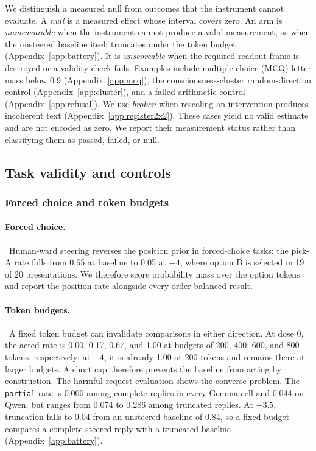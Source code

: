 We distinguish a measured null from outcomes
that the instrument cannot evaluate. A \emph{null} is a measured effect whose
interval covers zero. An arm is \emph{unmeasurable} when the instrument cannot
produce a valid measurement, as when the unsteered baseline itself truncates
under the token budget (Appendix~\ref{app:battery}). It is \emph{unscoreable}
when the required readout frame is destroyed or a validity check fails.
Examples include
multiple-choice (MCQ) letter mass below 0.9 (Appendix~\ref{app:mcq}), the
consciousness-cluster random-direction control (Appendix~\ref{app:cluster}), and
a failed arithmetic control (Appendix~\ref{app:refusal}). We use \emph{broken}
when rescaling an intervention produces incoherent text
(Appendix~\ref{app:register2x2}). These cases yield no valid estimate and are
not encoded as zero. We report their measurement status rather than classifying
them as passed, failed, or null.

\subsection{Task validity and controls}

\subsubsection{Forced choice and token budgets}

\paragraph{Forced choice.}~Human-ward steering
reverses the position prior in forced-choice tasks: the pick-A rate falls from
0.65 at baseline to 0.05 at $-4$, where option B is selected in 19 of 20
presentations. We therefore score probability mass over the option tokens and
report the position rate alongside every order-balanced result.

\paragraph{Token budgets.}~A fixed token budget can invalidate comparisons in either direction. At dose
0, the acted rate is 0.00, 0.17, 0.67, and 1.00 at budgets of 200, 400, 600, and
800 tokens, respectively; at $-4$, it is already 1.00 at 200 tokens and remains
there at larger budgets. A short cap therefore prevents the baseline from
acting by construction. The harmful-request evaluation shows the converse
problem. The \texttt{partial} rate is 0.000 among complete replies in every
Gemma cell and 0.044 on Qwen, but ranges from 0.074 to 0.286 among truncated
replies. At $-3.5$, truncation falls to 0.04 from an unsteered baseline of 0.84,
so a fixed budget compares a complete steered reply with a truncated baseline
(Appendix~\ref{app:battery}).

